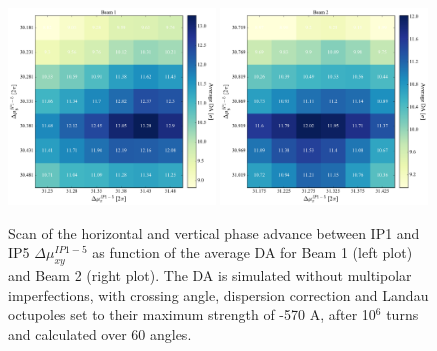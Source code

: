 \documentclass{cernatsnote}
\begin{document}
\begin{figure}[h!]
\centering
\includegraphics[width=0.49\textwidth]{images/scan_baseline_avg_b1.pdf} \hfill \includegraphics[width=0.49\textwidth]{images/scan_baseline_avg_b2.pdf} \\
\caption{\label{scan_da_base} Scan of the horizontal and vertical phase advance between IP1 and IP5 $\Delta\mu_{xy}^{IP1-5}$ as function of the average DA for Beam 1 (left plot) and Beam 2 (right plot). The DA is simulated without multipolar imperfections, with crossing angle, dispersion correction and Landau octupoles set to their maximum strength of -570 A, after 10$^{6}$ turns and calculated over 60 angles.}
\end{figure}
\end{document}
